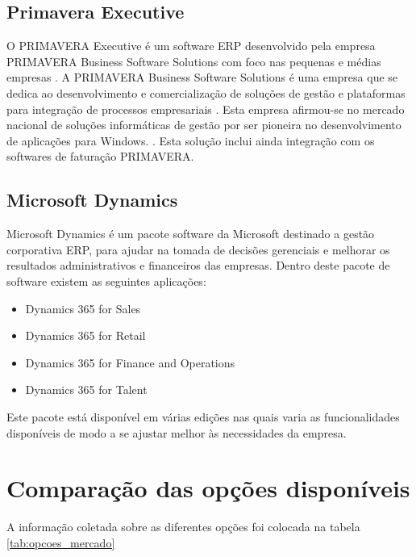 \subsection{Primavera Executive}
O PRIMAVERA Executive é um software ERP desenvolvido pela empresa PRIMAVERA Business Software Solutions com foco nas pequenas e médias empresas \cite{PRIMAVERABSS}. A PRIMAVERA Business Software Solutions é uma empresa que se dedica ao desenvolvimento e comercialização de soluções de gestão e plataformas para integração de processos empresariais \cite{Wikipediaa}. Esta empresa afirmou-se no mercado nacional de soluções informáticas de gestão por ser pioneira no desenvolvimento de aplicações para Windows. \cite{Wikipediaa}.
Esta solução inclui ainda integração com os softwares de faturação PRIMAVERA.

\subsection{Microsoft Dynamics}
Microsoft Dynamics é um pacote software da Microsoft destinado a gestão corporativa ERP, para ajudar na tomada de decisões gerenciais e melhorar os resultados administrativos e financeiros das empresas.\cite{Wikipediac}
Dentro deste pacote de software existem as seguintes aplicações:
\begin{itemize}
	\item Dynamics 365 for Sales
	\item Dynamics 365 for Retail
	\item Dynamics 365 for Finance and Operations
	\item Dynamics 365 for Talent
\end{itemize}
Este pacote está disponível em várias edições nas quais varia as funcionalidades disponíveis de modo a se ajustar melhor às necessidades da empresa.

\newpage

\section{Comparação das opções disponíveis}
A informação coletada sobre as diferentes opções foi colocada na tabela \ref{tab:opcoes_mercado}

